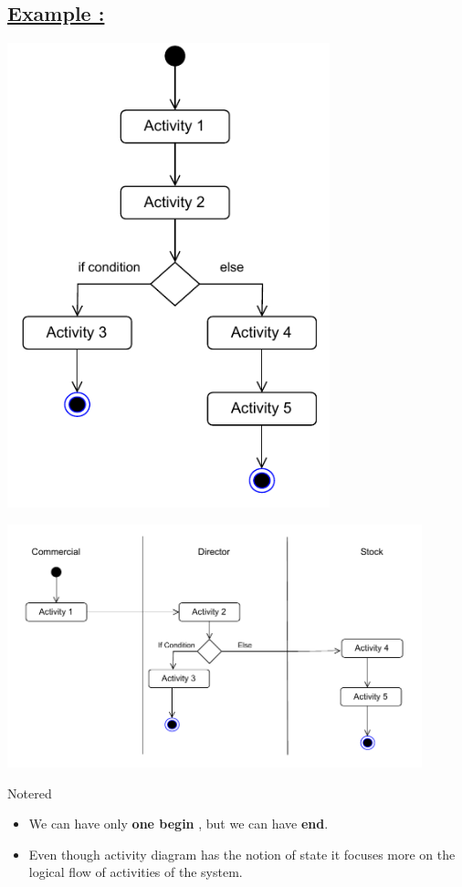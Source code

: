 \subsection*{\underline{Example :}}


\begin{center}
\includegraphics[width=0.7\textwidth,height=0.8\textheight]{Chapters/Diagram/AC/ac1.drawio.pdf}
\end{center}

\begin{center}
\includegraphics[width=0.9\textwidth,height=0.78\textheight]{Chapters/Diagram/AC/ac2.drawio.pdf}
\end{center}



\vspace{0.25cm}

\begin{prettyBox}{Note}{red}
\begin{itemize}
    \item We can have only \textbf{one begin} , but we can have \textbf{end}.
    \item Even though activity diagram has the notion of state it focuses more on the 
    logical flow of activities of the system.
\end{itemize}
\end{prettyBox}



